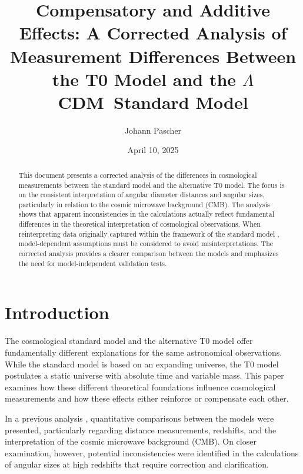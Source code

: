 \documentclass[a4paper,12pt]{article}
\newcommand{\LCDM}{\ensuremath{\Lambda}CDM}
\begin{document}
	
	\title{Compensatory and Additive Effects: A Corrected Analysis of Measurement Differences Between the T0 Model and the \LCDM\ Standard Model}
	\author{Johann Pascher}
	\date{April 10, 2025}
	\maketitle
	
	\begin{abstract}
		This document presents a corrected analysis of the differences in cosmological measurements between the standard model \cite{Planck2018} and the alternative T0 model. The focus is on the consistent interpretation of angular diameter distances and angular sizes, particularly in relation to the cosmic microwave background (CMB). The analysis shows that apparent inconsistencies in the calculations actually reflect fundamental differences in the theoretical interpretation of cosmological observations. When reinterpreting data originally captured within the framework of the standard model \cite{Planck2018}, model-dependent assumptions must be considered to avoid misinterpretations. The corrected analysis provides a clearer comparison between the models and emphasizes the need for model-independent validation tests.
	\end{abstract}
	
	\tableofcontents
	\newpage
	
	\section{Introduction}
	
	The cosmological standard model \cite{Planck2018} and the alternative T0 model offer fundamentally different explanations for the same astronomical observations. While the standard model \cite{Planck2018} is based on an expanding universe, the T0 model postulates a static universe with absolute time and variable mass. This paper examines how these different theoretical foundations influence cosmological measurements and how these effects either reinforce or compensate each other.
	
	In a previous analysis \cite{Pascher2025a}, quantitative comparisons between the models were presented, particularly regarding distance measurements, redshifts, and the interpretation of the cosmic microwave background (CMB). On closer examination, however, potential inconsistencies were identified in the calculations of angular sizes at high redshifts that require correction and clarification.
	
\end{document}
